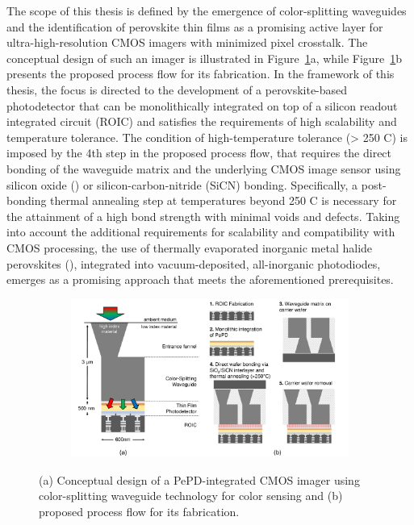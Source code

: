 The scope of this thesis is defined by the emergence of color-splitting waveguides and the identification of perovskite thin films as a promising active layer for ultra-high-resolution CMOS imagers with minimized pixel crosstalk. The conceptual design of such an imager is illustrated in Figure~\ref{fig:ch1:scope}a, while Figure~\ref{fig:ch1:scope}b presents the proposed process flow for its fabrication. In the framework of this thesis, the focus is directed to the development of a perovskite-based photodetector that can be monolithically integrated on top of a silicon readout integrated circuit (ROIC) and satisfies the requirements of high scalability and temperature tolerance. The condition of high-temperature tolerance (> 250 \degree C) is imposed by the 4th step in the proposed process flow, that requires the direct bonding of the waveguide matrix and the underlying CMOS image sensor using silicon oxide () or silicon-carbon-nitride (SiCN) bonding. Specifically, a post-bonding thermal annealing step at temperatures beyond 250 \degree C is necessary for the attainment of a high bond strength with minimal voids and defects. Taking into account the additional requirements for scalability and compatibility with CMOS processing, the use of thermally evaporated inorganic metal halide perovskites (), integrated into vacuum-deposited, all-inorganic photodiodes, emerges as a promising approach that meets the aforementioned prerequisites.


\begin{figure}[htbp]
    \centering
    \begin{subfigure}[t]{0.99\textwidth} %
        \centering
        \includegraphics[width=\textwidth]{chapters/introduction/image/waveguide_pepd.pdf} %
    \end{subfigure}

    \caption[Conceptualization and proposed fabrication steps of image sensors, utilizing color-splitting waveguide technology.]{(a) Conceptual design of a PePD-integrated CMOS imager using color-splitting waveguide technology for color sensing and (b) proposed process flow for its fabrication.}
    \label{fig:ch1:scope}
\end{figure}




